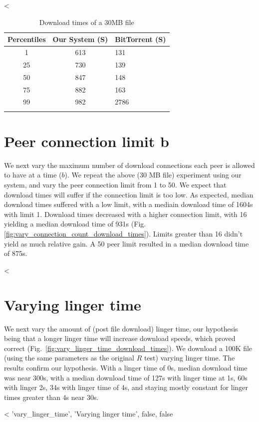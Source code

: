 <%

\begin{table}
  \caption{Download times of a 30MB file}
\begin{tabular}{ c c l }
  Percentiles & Our System (S) & BitTorrent (S) \\
  \hline
  1 & 613 & 131 \\
  25 & 730 & 139 \\
  50 & 847 & 148 \\
  75 & 882 & 163 \\
  99 & 982 & 2786 \\
  \label{fig:yanc_vs_bt}
\end{tabular}
\end{table}
  
\section{Peer connection limit b} 

We next vary the maximum number of download connections each peer is allowed to have at a time ($b$). We 
repeat the above (30 MB file) experiment using our system, and vary the peer connection limit from 1 to 50. 
We expect that download times will suffer if the connection limit is too low. As expected, median 
download times suffered with a low limit, with a mediain download time of 1604s with limit 1. Download 
times decreased with a higher connection limit, with 16 yielding a median download time of 931s 
(Fig. \ref{fig:vary_connection_count_download_times}).  Limits greater than 16 didn't 
yield as much relative gain. A 50 peer limit resulted in a median download time of 875s.

<%

\section{Varying linger time}

We next vary the amount of (post file download) linger time, our hypothesis being that a longer linger 
time will increase download speeds, which proved correct (Fig.~\ref{fig:vary_linger_time_download_times}). 
We download a 100K file (using the same parameters as the original $R$ test) varying linger time. The 
results confirm our hypothesis. With a linger time of 0s, median download time was near 300s, with 
a median download time of 127s with linger time at 1s, 60s with linger 2s, 34s with linger time of 4s, 
and staying mostly constant for linger times greater than 4s near 30s.

<%
 'vary_linger_time', 'Varying linger time', false, false %

